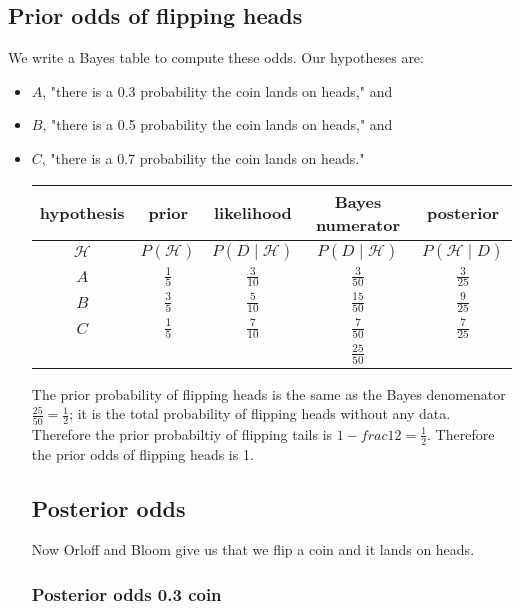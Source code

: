 \documentclass[a5paper,11pt]{article}
\begin{document}
\subsection{Prior odds of flipping heads}
We write a Bayes table to compute these odds.
Our hypotheses are:
\begin{itemize}
\item $A$, "there is a 0.3 probability the coin lands on heads," and
\item $B$, "there is a 0.5 probability the coin lands on heads," and
\item $C$, "there is a 0.7 probability the coin lands on heads."

\begin{center}
\begin{tabular}{ | c | c | c | c  | c | }
    \hline
    hypothesis & prior & likelihood & Bayes numerator & posterior\\ \hline
    $\mathcal{H}$ & $P\left(\mathcal{H}\right)$ & $P\left(D \mid \mathcal{H}\right)$ & $P\left(D \mid \mathcal{H} \right)$ & $P\left(\mathcal{H} \mid D \right)$ \\ \hline
    $A$ & $\frac{1}{5}$ & $\frac{3}{10}$ & $\frac{3}{50}$   & $\frac{3}{25}$ \\ \hline
    $B$ & $\frac{3}{5}$ & $\frac{5}{10}$ & $\frac{15}{50}$  & $\frac{9}{25}$ \\ \hline
    $C$ & $\frac{1}{5}$ & $\frac{7}{10}$ & $\frac{7}{50}$   & $\frac{7}{25}$ \\ \hline
    &  &  & $\frac{25}{50}$ &  \\ \hline
  \end{tabular}
\end{center}

The prior probability of flipping heads is the same as the
Bayes denomenator $\frac{25}{50}=\frac{1}{2}$; it is the total probability of 
flipping heads without any data.  Therefore the prior probabiltiy 
of flipping tails is $1-frac{1}{2} = \frac{1}{2}$.  Therefore the prior
odds of flipping heads is 1.

\subsection{Posterior odds}

Now Orloff and Bloom give us that we flip a coin and it lands on heads.

\subsubsection{Posterior odds 0.3 coin}


\end{itemize}
\end{document}
